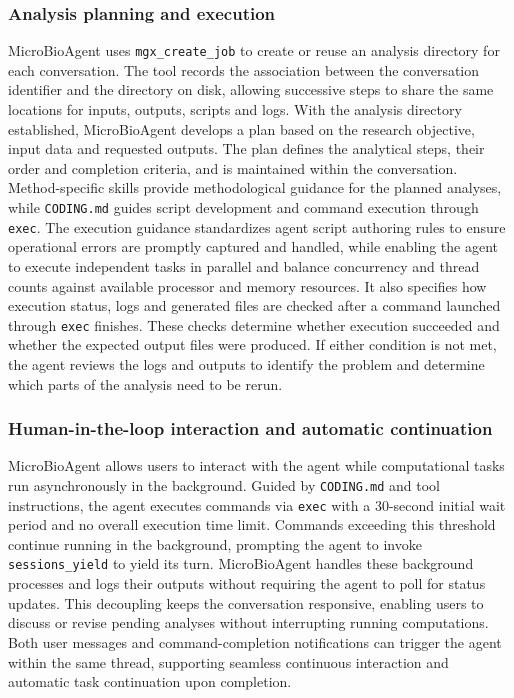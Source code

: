 \documentclass[10pt,letterpaper]{article}
\begin{document}
\subsubsection{Analysis planning and execution}
\label{sec:analysis-planning}

MicroBioAgent uses \texttt{mgx\_create\_job} to create or reuse an analysis
directory for each conversation.  The tool records the association between
the conversation identifier and the directory on disk, allowing successive
steps to share the same locations for inputs, outputs, scripts and logs.
With the analysis directory established, MicroBioAgent develops a plan based
on the research objective, input data and requested outputs.  The plan
defines the analytical steps, their order and completion criteria, and is
maintained within the conversation. Method-specific skills provide
methodological guidance for the planned analyses, while \texttt{CODING.md}
guides script development and command execution through \texttt{exec}.
The execution guidance standardizes agent script authoring rules to ensure 
operational errors are promptly captured and handled, while enabling the 
agent to execute independent tasks in parallel and balance concurrency and 
thread counts against available processor and memory resources.  It also specifies 
how execution status, logs and generated files are checked after a command 
launched through \texttt{exec} finishes. These checks determine whether 
execution succeeded and whether the expected output files were produced.  
If either condition is not met, the agent reviews the logs and outputs 
to identify the problem and determine which parts of the analysis need to 
be rerun.

\subsubsection{Human-in-the-loop interaction and automatic continuation}
\label{sec:asynchronous-execution}

MicroBioAgent allows users to interact with the agent while computational
tasks run asynchronously in the background. Guided by \texttt{CODING.md}
and tool instructions, the agent executes commands via \texttt{exec} with
a 30-second initial wait period and no overall execution time limit.
Commands exceeding this threshold continue running in the background,
prompting the agent to invoke \texttt{sessions\_yield} to yield its turn.
MicroBioAgent handles these background processes and logs their outputs
without requiring the agent to poll for status updates. This decoupling
keeps the conversation responsive, enabling users to discuss or revise
pending analyses without interrupting running computations. Both user
messages and command-completion notifications can trigger the agent within
the same thread, supporting seamless continuous interaction and automatic
task continuation upon completion.
\end{document}
